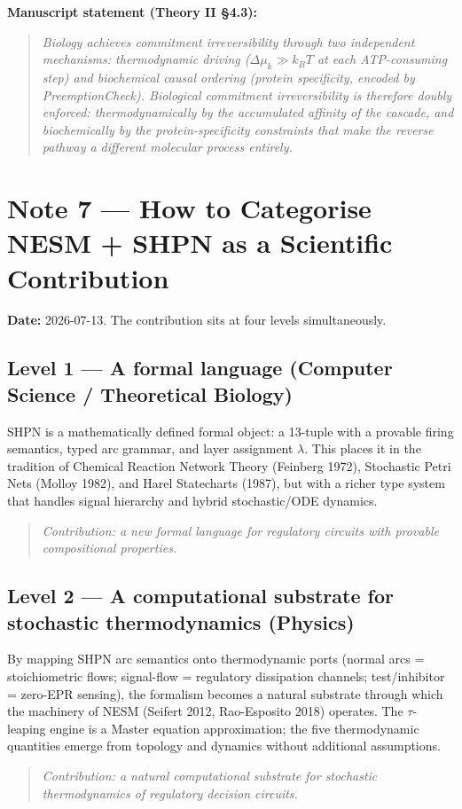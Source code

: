 \documentclass[11pt,a4paper]{article}
\begin{document}
\textbf{Manuscript statement (Theory II §4.3):}
\begin{quote}
\emph{Biology achieves commitment irreversibility through two independent
mechanisms: thermodynamic driving ($\Delta\mu_k \gg k_BT$ at each
ATP-consuming step) and biochemical causal ordering (protein specificity,
encoded by PreemptionCheck). Biological commitment irreversibility is
therefore doubly enforced: thermodynamically by the accumulated affinity
of the cascade, and biochemically by the protein-specificity constraints
that make the reverse pathway a different molecular process entirely.}
\end{quote}

\section*{Note 7 — How to Categorise NESM + SHPN as a Scientific Contribution}

\textbf{Date:} 2026-07-13.
The contribution sits at four levels simultaneously.

\subsection*{Level 1 — A formal language (Computer Science / Theoretical Biology)}

SHPN is a mathematically defined formal object: a 13-tuple with a provable
firing semantics, typed arc grammar, and layer assignment $\lambda$.
This places it in the tradition of Chemical Reaction Network Theory
(Feinberg 1972), Stochastic Petri Nets (Molloy 1982), and Harel Statecharts
(1987), but with a richer type system that handles signal hierarchy and
hybrid stochastic/ODE dynamics.
\begin{quote}
\emph{Contribution: a new formal language for regulatory circuits with
provable compositional properties.}
\end{quote}

\subsection*{Level 2 — A computational substrate for stochastic thermodynamics (Physics)}

By mapping SHPN arc semantics onto thermodynamic ports (normal arcs =
stoichiometric flows; signal-flow = regulatory dissipation channels;
test/inhibitor = zero-EPR sensing), the formalism becomes a natural
substrate through which the machinery of NESM (Seifert 2012,
Rao-Esposito 2018) operates.
The $\tau$-leaping engine is a Master equation approximation; the five
thermodynamic quantities emerge from topology and dynamics without
additional assumptions.
\begin{quote}
\emph{Contribution: a natural computational substrate for stochastic
thermodynamics of regulatory decision circuits.}
\end{quote}
\end{document}
